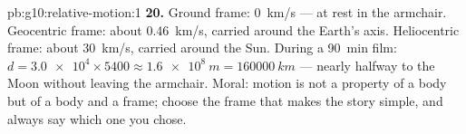 \begin{solution}{pb:g10:relative-motion:1}
\textbf{20.} Ground frame: \qty{0}{km/s} --- at rest in the armchair.
Geocentric frame: about \qty{0.46}{km/s}, carried around the Earth's
axis. Heliocentric frame: about \qty{30}{km/s}, carried around the Sun.
During a \qty{90}{min} film: $d = \num{3.0e4} \times 5400
\approx \qty{1.6e8}{m} = \qty{160000}{km}$ --- nearly halfway to the
Moon without leaving the armchair. Moral: motion is not a property of a
body but of a body and a frame; choose the frame that makes the story
simple, and always say which one you chose.
\end{solution}
